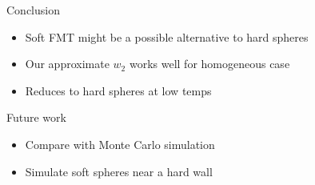 \documentclass{beamer}
\begin{document}
\begin{frame}{Conclusion}
  \begin{itemize}
    \item Soft FMT might be a possible alternative to hard spheres
    \item Our approximate $w_2$ works well for homogeneous case
    \item Reduces to hard spheres at low temps
  \end{itemize}
  \begin{block}{Future work}
    \begin{itemize}
      \item Compare with Monte Carlo simulation
      \item Simulate soft spheres near a hard wall
    \end{itemize}
  \end{block}
\end{frame}
\end{document}
